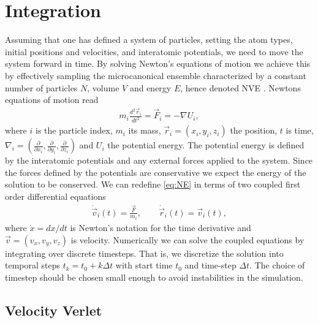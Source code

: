 \section{Integration}\label{sec:integration}
Assuming that one has defined a system of particles, setting the atom types, initial positions and velocities, and interatomic potentials, we need
to move the system forward in time. By solving Newton's equations of motion we achieve this by effectively sampling the microcanonical ensemble characterized by a constant number of particles $N$, volume $V$ and energy $E$, hence denoted NVE \cite{dfrenkel96:mc}. Newtons equations of motion read
\begin{align}
  m_i \frac{d^2 \vec{r}_i}{dt^2} = \vec{F}_i = -\nabla U_i,
  \label{eq:NE}
\end{align}
where $i$ is the particle index, $m_i$ its mass, $\vec{r}_i = (x_i, y_i,
z_i)$ the position, $t$ is time, $\nabla_i = (\frac{\partial}{\partial x_i},
\frac{\partial}{\partial y_i}, \frac{\partial}{\partial z_i})$ and $U_i$ the
potential energy. The potential energy is defined by the interatomic potentials and any external forces applied to the system. Since the forces defined by the potentials are conservative we expect the energy of the solution
to be conserved. We can redefine \cref{eq:NE} in terms of two coupled first
order differential equations 
\begin{align}
  \dot{\vec{v}}_i(t) = \frac{\vec{F}}{m_i}, \qquad \dot{\vec{r}}_i(t) = \vec{v}_i(t),
  \label{eq:NE_2}
\end{align}
where $\dot{x} = dx/dt$ is Newton's notation for the time derivative and $\vec{v} = (v_x,v_y,v_z)$ is velocity. Numerically we can solve the coupled equations by integrating over discrete timesteps. That is, we discretize the solution into temporal steps $t_k = t_0 + k\Delta t$ with start time $t_0$ and time-step $\Delta t$. The choice of timestep should be chosen small enough to avoid instabilities in the simulation. 


\subsection{Velocity Verlet}

